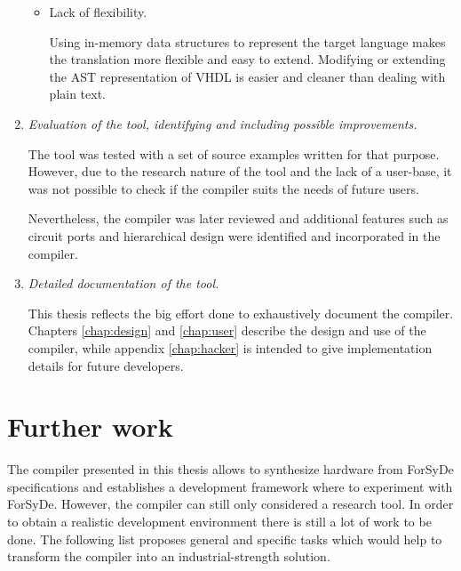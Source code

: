 \begin{enumerate}[1)]
\begin{itemize}
    
    
  \item Lack of flexibility. 

    Using in-memory data structures to represent the target language
    makes the translation more flexible and easy to extend. Modifying
    or extending the AST representation of VHDL is easier and cleaner
    than dealing with plain text.
    
  \end{itemize}

  
\item \textit{Evaluation of the tool, identifying and including
    possible improvements.}

  The tool was tested with a set of source examples written for that
  purpose.  However, due to the research nature of the tool and the
  lack of a user-base, it was not possible to check if the compiler
  suits the needs of future users.
  
  Nevertheless, the compiler was later reviewed and additional
  features such as circuit ports and hierarchical design were
  identified and incorporated in the compiler.
  

\item \textit{Detailed documentation of the tool.}  

  This thesis reflects the big effort done to exhaustively document
  the compiler. Chapters \ref{chap:design} and \ref{chap:user}
  describe the design and use of the compiler, while appendix
  \ref{chap:hacker} is intended to give implementation details for
  future developers.
  

\end{enumerate}


\section{Further work}

The compiler presented in this thesis allows to synthesize hardware
from ForSyDe specifications and establishes a development framework
where to experiment with ForSyDe. However, the compiler can still only
considered a research tool. In order to obtain a realistic development
environment there is still a lot of work to be done. The following
list proposes general and specific tasks which would help to transform
the compiler into an industrial-strength solution.

